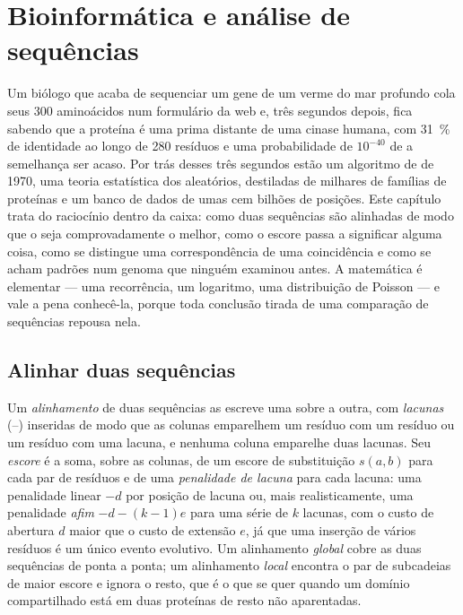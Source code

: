 \chapter{Bioinformática e análise de sequências}\label{ch:b3:bioinformatics}

Um biólogo que acaba de sequenciar um gene de um verme do mar profundo
cola seus \num{300} aminoácidos num formulário da web e, três segundos
depois, fica sabendo que a proteína é uma prima distante de uma cinase
humana, com \qty{31}{\%} de identidade ao longo de \num{280} resíduos
e uma probabilidade de $10^{-40}$ de a semelhança ser acaso. Por trás
desses três segundos estão um algoritmo de  de
1970, uma teoria estatística dos  aleatórios,  destiladas de milhares de famílias de proteínas e um
banco de dados de umas cem bilhões de posições. Este capítulo trata do
raciocínio dentro da caixa: como duas sequências são alinhadas de modo
que o  seja comprovadamente o melhor, como o escore passa a
significar alguma coisa, como se distingue uma correspondência de uma
coincidência e como se acham padrões num genoma que ninguém examinou
antes. A matemática é elementar --- uma recorrência, um logaritmo, uma
distribuição de Poisson --- e vale a pena conhecê-la, porque toda
conclusão tirada de uma comparação de sequências repousa nela.

\section{Alinhar duas sequências}

\begin{definition}\label{def:b3:bioinformatics:alignment}
Um \emph{alinhamento} de duas sequências as escreve uma sobre a outra,
com \emph{lacunas} (--) inseridas de modo que as colunas emparelhem um
resíduo com um resíduo ou um resíduo com uma lacuna, e nenhuma coluna
emparelhe duas lacunas. Seu \emph{escore} é a soma, sobre as colunas,
de um escore de substituição $s(a,b)$ para cada par de resíduos e de
uma \emph{penalidade de lacuna} para cada lacuna: uma penalidade
linear $-d$ por posição de lacuna ou, mais realisticamente, uma
penalidade \emph{afim} $-d - (k-1)e$ para uma série de $k$ lacunas, com
o custo de abertura $d$ maior que o custo de extensão $e$, já que uma
inserção de vários resíduos é um único evento evolutivo. Um
alinhamento \emph{global} cobre as duas sequências de ponta a ponta; um
alinhamento \emph{local} encontra o par de subcadeias de maior escore e
ignora o resto, que é o que se quer quando um domínio compartilhado
está em duas proteínas de resto não aparentadas.
\end{definition}


